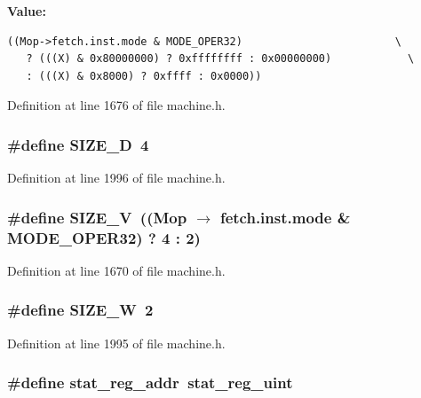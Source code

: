 \textbf{Value:}

\begin{Code}\begin{verbatim}((Mop->fetch.inst.mode & MODE_OPER32)                        \
   ? (((X) & 0x80000000) ? 0xffffffff : 0x00000000)            \
   : (((X) & 0x8000) ? 0xffff : 0x0000))
\end{verbatim}
\end{Code}


Definition at line 1676 of file machine.h.
\subsubsection[{SIZE\_\-D}]{\setlength{\rightskip}{0pt plus 5cm}\#define SIZE\_\-D~4}\label{machine_8h_c4d95a484821ca67d70b1c8e581edd95}




Definition at line 1996 of file machine.h.
\subsubsection[{SIZE\_\-V}]{\setlength{\rightskip}{0pt plus 5cm}\#define SIZE\_\-V~((Mop $\rightarrow$ fetch.inst.mode \& MODE\_\-OPER32) ? 4 : 2)}\label{machine_8h_1fef9e7ada729f067830f0704cb85cc1}




Definition at line 1670 of file machine.h.
\subsubsection[{SIZE\_\-W}]{\setlength{\rightskip}{0pt plus 5cm}\#define SIZE\_\-W~2}\label{machine_8h_8b1bb81baf4a4b2accf30d9b4a699332}




Definition at line 1995 of file machine.h.
\subsubsection[{stat\_\-reg\_\-addr}]{\setlength{\rightskip}{0pt plus 5cm}\#define stat\_\-reg\_\-addr~stat\_\-reg\_\-uint}\label{machine_8h_fac0d75c69f960996fcdaac436eb2e2a}




